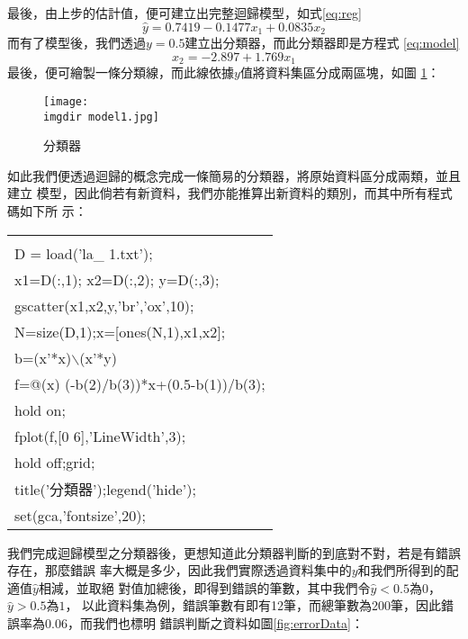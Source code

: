 \begin{enumerate}[Step 1：]
{					最後，由上步的估計值，便可建立出完整迴歸模型，如式\ref{eq:reg}
					\begin{equation}\label{eq:reg}
 						\hat{y}=0.7419-0.1477x_1+0.0835x_2
 					\end{equation}
 					而有了模型後，我們透過$y=0.5$建立出分類器，而此分類器即是方程式									\ref{eq:model}
 					\begin{equation}\label{eq:model} 						
 						x_2=-2.897+1.769x_1
 					\end{equation}
 					最後，便可繪製一條分類線，而此線依據$y$值將資料集區分成兩區塊，如圖								\ref{fig:model1}：
 					\begin{figure}[H]	
		 		 		\centering	 			 	 
   				 		\texttt{[image: \\imgdir model1.jpg]} 
   			 			\caption{分類器}   		
   			 			\label{fig:model1}   			 		 
					\end{figure}
					如此我們便透過迴歸的概念完成一條簡易的分類器，將原始資料區分成兩類，並且建立						模型，因此倘若有新資料，我們亦能推算出新資料的類別，而其中所有程式碼如下所							示：
					\begin{center}\colorbox{slight}{
						\begin{tabular}{p{}}
							\MJHmarker{\textbf{\color{darkblue}{MATLAB語法 :}}}\\		
							D = load('la\_ 1.txt');\\							
							x1=D(:,1); x2=D(:,2); y=D(:,3);\\
							gscatter(x1,x2,y,'br','ox',10);\\
							N=size(D,1);x=[ones(N,1),x1,x2];\\							
							b=(x'*x)$\backslash$(x'*y)\\
							f=@(x) (-b(2)/b(3))*x+(0.5-b(1))/b(3);\\
							hold on;\\
							fplot(f,[0 6],'LineWidth',3);\\
							hold off;grid;\\							
							title('分類器');legend('hide');\\							
							set(gca,'fontsize',20);\\
						\end{tabular}
					}
					\end{center}
				}
			\end{enumerate}
			我們完成迴歸模型之分類器後，更想知道此分類器判斷的到底對不對，若是有錯誤存在，那麼錯誤				率大概是多少，因此我們實際透過資料集中的$y$和我們所得到的配適值$\hat{y}$相減，並取絕				對值加總後，即得到錯誤的筆數，其中我們令$\hat{y}<0.5$為$0$，$\hat{y}>0.5$為$1$，				以此資料集為例，錯誤筆數有即有12筆，而總筆數為200筆，因此錯誤率為$0.06$，而我們也標明				錯誤判斷之資料如圖\ref{fig:errorData}：
